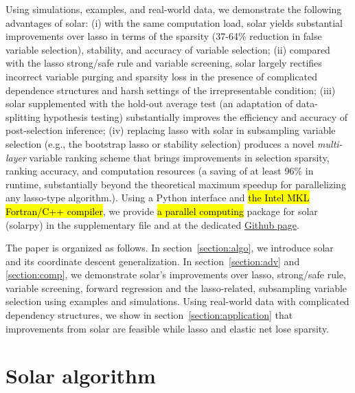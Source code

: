 \documentclass[12pt]{article}
\begin{document}
Using simulations, examples, and real-world data, we demonstrate the following advantages of solar: (i) with the same computation load, solar yields substantial improvements over lasso in terms of the sparsity (37-64\% reduction in false variable selection), stability, and accuracy of variable selection; (ii) compared with the lasso strong/safe rule and variable screening, solar largely rectifies incorrect variable purging and sparsity loss in the presence of complicated dependence structures and harsh settings of the irrepresentable condition; (iii) solar supplemented with the hold-out average test (an adaptation of data-splitting hypothesis testing) substantially improves the efficiency and accuracy of post-selection inference; (iv) replacing lasso with solar in subsampling variable selection (e.g., the bootstrap lasso or stability selection) produces a novel \emph{multi-layer} variable ranking scheme that brings improvements in selection sparsity, ranking accuracy, and computation resources (a saving of at least 96\% in runtime, substantially beyond the theoretical maximum speedup for parallelizing any lasso-type algorithm.). Using a Python interface and \hl{the Intel MKL Fortran/C++ compiler}, we provide \hl{a parallel computing} package for solar (solarpy) in the supplementary file and at the dedicated \href{https://github.com/isaac2math/solarpy}{Github page}.

The paper is organized as follows. In section~\ref{section:algo}, we introduce solar and its coordinate descent generalization. In section~\ref{section:adv} and \ref{section:comp}, we demonstrate solar's improvements over lasso, strong/safe rule, variable screening, forward regression and the lasso-related, subsampling variable selection using examples and simulations. Using real-world data with complicated dependency structures, we show in section~\ref{section:application} that improvements from solar are feasible while lasso and elastic net lose sparsity.


\section{Solar algorithm \label{section:algo}}
\end{document}
